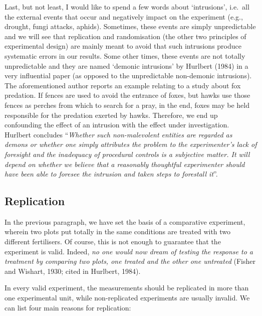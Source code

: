 \documentclass[a4paper,12pt,oneside]{book}
\begin{document}
Last, but not least, I would like to spend a few words about `intrusions', i.e.~all the external events that occur and negatively impact on the experiment (e.g., drought, fungi attacks, aphids). Sometimes, these events are simply unpredictable and we will see that replication and randomisation (the other two principles of experimental design) are mainly meant to avoid that such intrusions produce systematic errors in our results. Some other times, these events are not totally unpredictable and they are named `demonic intrusions' by Hurlbert (1984) in a very influential paper (as opposed to the unpredictable non-demonic intrusions). The aforementioned author reports an example relating to a study about fox predation. If fences are used to avoid the entrance of foxes, but hawks use those fences as perches from which to search for a pray, in the end, foxes may be held responsible for the predation exerted by hawks. Therefore, we end up confounding the effect of an intrusion with the effect under investigation. Hurlbert concludes ``\emph{Whether such non-malevolent entities are regarded as demons or whether one simply attributes the problem to the experimenter's lack of foresight and the inadequacy of procedural controls is a subjective matter. It will depend on whether we believe that a reasonably thoughtful experimenter should have been able to foresee the intrusion and taken steps to forestall it}''.

\hypertarget{replication}{%
\subsection{Replication}\label{replication}}

In the previous paragraph, we have set the basis of a comparative experiment, wherein two plots put totally in the same conditions are treated with two different fertilisers. Of course, this is not enough to guarantee that the experiment is valid. Indeed, \emph{no one would now dream of testing the response to a treatment by comparing two plots, one treated and the other one untreated} (Fisher and Wishart, 1930; cited in Hurlbert, 1984).

In every valid experiment, the measurements should be replicated in more than one experimental unit, while non-replicated experiments are usually invalid. We can list four main reasons for replication:
\end{document}

